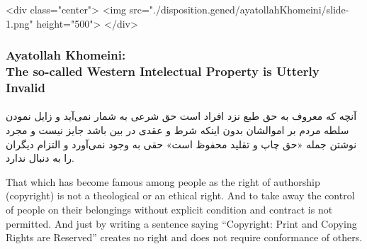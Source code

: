 \begin{whenOrg}
\begin{htmlonly}
\begin{frame}[fragile,plain,label=ayatollahKhomeini]
    \frametitle{}
    \framesubtitle{}
    \begin{rawhtml}
<div class="center">
<img src="./disposition.gened/ayatollahKhomeini/slide-1.png" height="500">
</div>
    \end{rawhtml}
\end{frame}
\end{htmlonly}

\begin{verblatex}

\begin{frame}[fragile,plain,label=ayatollahKhomeini]
    \frametitle{Ayatollah Khomeini:\\ The so-called Western Intelectual Property is Utterly Invalid}
    \framesubtitle{}



\RTL
  \begin{faPar}


آنچه كه معروف به حق طبع نزد افراد است حق شرعی به شمار نمی‌آید و زایل نمودن سلطه مردم بر
اموالشان بدون اینكه شرط و عقدی در بین باشد جایز نیست و مجرد نوشتن جمله «حق چاپ و تقلید
محفوظ است» حقی به وجود نمی‌آورد و التزام دیگران را به دنبال ندارد.

  \end{faPar}
\LTR

  \bigskip


  That which has become famous among people as the
  right of authorship (copyright) is not a theological or an
  ethical right.
  And to take away the control of people on their
  belongings without explicit condition and contract is not
  permitted. And just by writing a sentence saying ``Copyright: Print and Copying Rights are Reserved''
  creates no right and does not require conformance of others.




\end{frame}
\end{verblatex}
\end{whenOrg}
